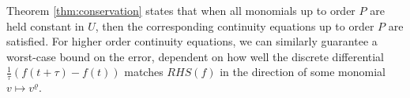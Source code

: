 Theorem \ref{thm:conservation} states that when all monomials up to order $P$ are held 
constant in $U$, then the corresponding continuity equations up to order $P$ are 
satisfied. For higher order continuity equations, we can similarly guarantee a worst-case 
bound on the error, dependent on how well the discrete differential 
$\frac{1}{\tau} (f(t + \tau) - f(t))$ matches $RHS(f)$ in the direction of some monomial 
$v \mapsto v^\varrho$. 

